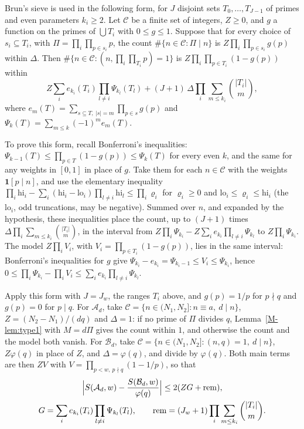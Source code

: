 \documentclass[11pt]{article}
\numberwithin{equation}{section}
\begin{document}
Brun's sieve \cite{brun} is used in the following form, for $J$ disjoint sets $T_0, \dots, T_{J - 1}$ of primes and even
parameters $k_i \ge 2$. Let $\mathcal C$ be a finite set of integers, $Z \ge 0$, and $g$ a function on the primes of
$\bigcup T_i$ with
$0 \le g \le 1$. Suppose that for every choice of $s_i \subseteq T_i$, with $\Pi = \prod_i \prod_{p \in s_i} p$, the
count $\#\{n \in \mathcal C : \Pi \mid n\}$ is $Z \prod_i \prod_{p \in s_i} g(p)$ within $\Delta$. Then $\#\{n \in
\mathcal C : (n, \prod_i \prod_{T_i} p) = 1\}$ is $Z \prod_i \prod_{p \in T_i} (1 - g(p))$ within
\[
  Z \sum_i e_{k_i}(T_i) \prod_{l \ne i} \Psi_{k_l}(T_l) + (J + 1) \, \Delta \prod_i \sum_{m \le k_i} \binom{|T_i|}{m},
\]
where $e_m(T) = \sum_{s \subseteq T,\ |s| = m} \prod_{p \in s} g(p)$ and $\Psi_k(T) = \sum_{m \le k} (-1)^m e_m(T)$.

To prove this form, recall Bonferroni's inequalities: $\Psi_{k - 1}(T) \le \prod_{p \in T}(1 - g(p)) \le \Psi_k(T)$ for
every even $k$, and the
same for any weights in $[0, 1]$ in place of $g$. Take them for each $n \in \mathcal C$ with the weights $\mathbf 1[p
\mid n]$, and use the elementary inequality $\prod_i \mathrm{hi}_i - \sum_i (\mathrm{hi}_i - \mathrm{lo}_i) \prod_{l \ne
i} \mathrm{hi}_l \le \prod_i \varrho_i$ for $\varrho_i \ge 0$ and $\mathrm{lo}_i \le \varrho_i \le \mathrm{hi}_i$ (the
$\mathrm{lo}_i$, odd truncations, may be negative). Summed over $n$, and expanded by the hypothesis, these inequalities
place the count, up to $(J + 1)$ times $\Delta \prod_i \sum_{m \le k_i} \binom{|T_i|}{m}$, in the interval from
$Z \prod_i \Psi_{k_i} - Z \sum_i e_{k_i} \prod_{l \ne i} \Psi_{k_l}$ to $Z \prod_i \Psi_{k_i}$. The model
$Z \prod_i V_i$, with $V_i = \prod_{p \in T_i}(1 - g(p))$, lies in the same interval: Bonferroni's inequalities for $g$
give $\Psi_{k_i} - e_{k_i} = \Psi_{k_i - 1} \le V_i \le \Psi_{k_i}$, hence $0 \le \prod_i \Psi_{k_i} - \prod_i V_i \le
\sum_i e_{k_i} \prod_{l \ne i} \Psi_{k_l}$.

Apply this form with $J = J_w$, the ranges $T_i$ above, and $g(p) = 1/p$ for $p \nmid q$ and $g(p) = 0$ for $p \mid
q$. For $\mathcal A_d$, take $\mathcal C = \{n \in (N_1,
N_2] : n \equiv a,\ d \mid n\}$, $Z = (N_2 - N_1)/(dq)$ and $\Delta = 1$: if no prime of $\Pi$ divides $q$,
Lemma~\ref{M-lem:type1} with $M = d\Pi$ gives the count within $1$, and otherwise the count and the model both vanish.
For $\mathcal B_d$, take $\mathcal C = \{n \in (N_1, N_2] : (n, q) = 1,\ d \mid n\}$, $Z\varphi(q)$ in place of $Z$, and
$\Delta =
\varphi(q)$, and divide by $\varphi(q)$. Both main terms are then $ZV$ with $V = \prod_{p < w,\ p \nmid q}(1 - 1/p)$, so
that
\begin{gather*}
  \Bigl|S(\mathcal A_d, w) - \frac{S(\mathcal B_d, w)}{\varphi(q)}\Bigr| \le 2(ZG + \mathrm{rem}), \\
  G = \sum_i e_{k_i}(T_i) \prod_{l \ne i} \Psi_{k_l}(T_l), \qquad
  \mathrm{rem} = (J_w + 1) \prod_i \sum_{m \le k_i} \binom{|T_i|}{m}.
\end{gather*}
\end{document}
